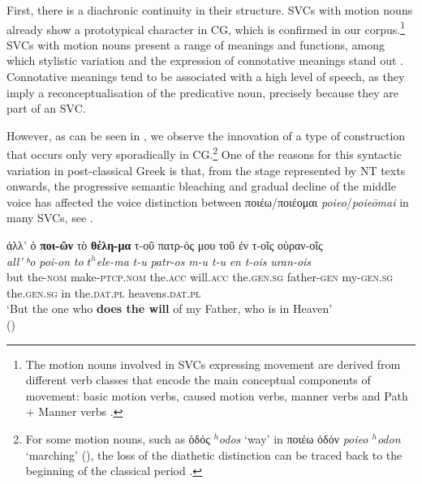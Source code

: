 \documentclass[output=paper,colorlinks,citecolor=brown]{langscibook}
\begin{document}
\z

\z

First, there is a diachronic continuity in their structure. SVCs with motion nouns
already show a prototypical character in CG, which is confirmed in our
corpus.\footnote{The motion nouns involved in SVCs expressing movement are derived from
  different verb classes that encode the main conceptual components of movement: basic
  motion verbs, caused motion verbs, manner verbs and Path + Manner verbs
  \parencite{DePasqualeNoemi-2023335}.} SVCs with motion nouns present a range of meanings
and functions, among which stylistic variation and the expression of connotative meanings
stand out \parencite{DePasqualeNoemi-2023335}. Connotative meanings tend to be associated
with a high level of speech, as they imply a reconceptualisation of the predicative noun,
precisely because they are part of an SVC.

However, as can be seen in , we observe the innovation of a type
of construction that occurs only very sporadically in CG.\footnote{For some motion nouns,
  such as ὁδός \emph{$^h$odos} `way' in ποιέω ὁδόν \emph{poieo $^h$odon} `marching' (), the loss of the diathetic distinction can be traced back to
  the beginning of the classical period \parencite{MariniEmmanuela-2010345}.} One of the
reasons for this syntactic variation in post-classical Greek is that, from the stage
represented by NT texts onwards, the progressive semantic bleaching and gradual decline of the
middle voice has affected the voice distinction between ποιέω/ποιέομαι
\emph{poieo}/\emph{poieōmai} in many SVCs, see . 


\ea\label{ex:vc:5}

\ea\label{ex:vc:5a}

\glll ἀλλ' ὁ \textbf{ποι-ῶν} τὸ \textbf{θέλη-μα} τ-οῦ πατρ-ός μου τοῦ ἐν τ-οῖς οὐραν-οῖς\\
 \textit{all'} \textit{ʰo} \textit{poi-on} \textit{to} \textit{$t^h$ele-ma} \textit{t-u} \textit{patr-os} \textit{m-u} \textit{t-u} \textit{en} \textit{t-ois} \textit{uran-ois}\\
but the-\textsc{nom} make-\textsc{ptcp.nom} the.\textsc{acc} will.\textsc{acc} the.\textsc{gen.sg} father-\textsc{gen} my-\textsc{gen.sg} the.\textsc{gen.sg} in
the\textsc{.dat.pl} heavens.\textsc{dat.pl}\\
\glt `But the one who \textbf{does the will} of my Father, who is in Heaven' \\
\hspace*{\fill}()
\end{document}
